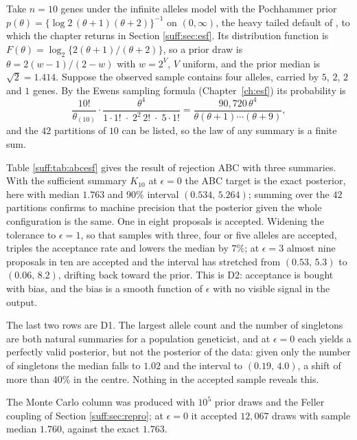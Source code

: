 \begin{example}
\label{suff:ex:abcesf}
Take $n=10$ genes under the infinite alleles model with the Pochhammer prior
$p(\theta)=\{\log 2\,(\theta+1)(\theta+2)\}^{-1}$ on $(0,\infty)$, the heavy tailed default
of \citet{suff:wangpolson2024}, to which the chapter returns in Section \ref{suff:sec:esf}. Its distribution function
is $F(\theta)=\log_2\{2(\theta+1)/(\theta+2)\}$, so a prior draw is
$\theta=2(w-1)/(2-w)$ with $w=2^{V}$, $V$ uniform, and the prior median is $\sqrt2=1.414$.
Suppose the observed sample contains four alleles, carried by $5$, $2$, $2$ and $1$ genes.
By the Ewens sampling formula (Chapter~\ref{ch:esf}) its probability is
\[
\frac{10!}{\theta_{(10)}}\cdot\frac{\theta^{4}}{1\cdot 1!\;\cdot\;2^{2}\,2!\;\cdot\;5\cdot 1!}
=\frac{90{,}720\,\theta^{4}}{\theta(\theta+1)\cdots(\theta+9)} ,
\]
and the $42$ partitions of $10$ can be listed, so the law of any summary is a finite sum.

Table \ref{suff:tab:abcesf} gives the result of rejection ABC with three summaries. With the
sufficient summary $K_{10}$ at $\epsilon=0$ the ABC target is the exact posterior, here with
median $1.763$ and $90\%$ interval $(0.534,\,5.264)$; summing over the $42$ partitions
confirms to machine precision that the posterior given the whole configuration is the same.
One in eight proposals is accepted. Widening the tolerance to $\epsilon=1$, so that samples
with three, four or five alleles are accepted, triples the acceptance rate and lowers the
median by $7\%$; at $\epsilon=3$ almost nine proposals in ten are accepted and the interval
has stretched from $(0.53,\,5.3)$ to $(0.06,\,8.2)$, drifting back toward the prior. This is
D2: acceptance is bought with bias, and the bias is a smooth function of $\epsilon$ with no
visible signal in the output.

The last two rows are D1. The largest allele count and the number of singletons are both
natural summaries for a population geneticist, and at $\epsilon=0$ each yields a perfectly
valid posterior, but not the posterior of the data: given only the number of singletons the
median falls to $1.02$ and the interval to $(0.19,\,4.0)$, a shift of more than $40\%$ in the
centre. Nothing in the accepted sample reveals this.

The Monte Carlo column was produced with $10^5$ prior draws and the Feller coupling of
Section \ref{suff:sec:repro}; at $\epsilon=0$ it accepted $12{,}067$ draws with sample
median $1.760$, against the exact $1.763$.
\end{example}


